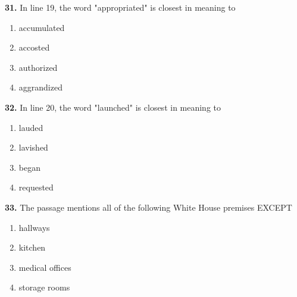 \documentclass[12pt]{article}
\begin{document}
\par
\vspace{0.25\baselineskip}
\noindent\textbf{31.} In line 19, the word "appropriated" is closest in meaning to
\begin{enumerate}[label=(\Alph*),leftmargin=*,itemsep=0.2em]
\item accumulated
\item accosted
\item authorized
\item aggrandized
\end{enumerate}
\par
\vspace{0.25\baselineskip}
\noindent\textbf{32.} In line 20, the word "launched" is closest in meaning to
\begin{enumerate}[label=(\Alph*),leftmargin=*,itemsep=0.2em]
\item lauded
\item lavished
\item began
\item requested
\end{enumerate}
\par
\vspace{0.25\baselineskip}
\noindent\textbf{33.} The passage mentions all of the following White House premises EXCEPT
\begin{enumerate}[label=(\Alph*),leftmargin=*,itemsep=0.2em]
\item hallways
\item kitchen
\item medical offices
\item storage rooms
\end{enumerate}
\par
\vspace{0.25\baselineskip}
\end{document}
